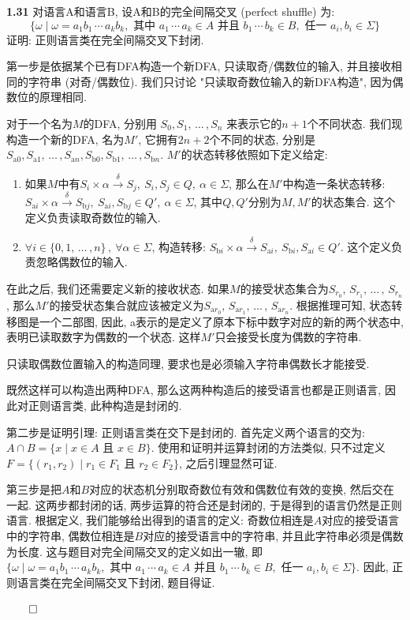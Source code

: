 \documentclass[UTF8]{report}
\newcommand{\problem}[1]{{\setlength{\parskip}{10pt}\noindent \bf{#1}}}
\renewenvironment{proof}{{\setlength{\parskip}{7pt}\noindent\hskip 2em \bf 证明 \quad}}{\hfill$\qed$\par}
\begin{document}
\problem{1.31} 对语言A和语言B, 设A和B的完全间隔交叉 (perfect shuffle) 为:
\[
    \{ \omega \mid \omega = a_1b_1 \,\cdots\, a_kb_k,\text{ 其中 } a_1\,\cdots\, a_k \in A \text{ 并且 } b_1\,\cdots\, b_k \in B, \text{ 任一 } a_i,b_i\in\Sigma \}
\]
证明: 正则语言类在完全间隔交叉下封闭.

\begin{proof}
    第一步是依据某个已有DFA构造一个新DFA, 只读取奇/偶数位的输入, 并且接收相同的字符串 (对奇/偶数位). 我们只讨论 "只读取奇数位输入的新DFA构造", 因为偶数位的原理相同.
    
    对于一个名为$M$的DFA, 分别用 $S_0, S_1,\,\dots\,,S_n$ 来表示它的$n+1$个不同状态. 我们现构造一个新的DFA, 名为$M'$, 它拥有$2n+2$个不同的状态, 分别是 $S_{\text{a}0}, S_{\text{a}1},\,\dots\,,S_{\text{a}n},S_{\text{b}0}, S_{\text{b}1},\,\dots\,,S_{\text{b}n}$. $M'$的状态转移依照如下定义给定:

    \begin{enumerate}
        \item 如果$M$中有$S_i\times \alpha \xrightarrow{\delta} S_j,\ S_i, S_j\in Q,\ \alpha\in\Sigma$, 那么在$M'$中构造一条状态转移: $S_{\text{a}i}\times \alpha \xrightarrow{\delta} S_{\text{b}j},\ S_{\text{a}i}, S_{\text{b}j}\in Q',\ \alpha\in\Sigma$, 其中$Q, Q'$分别为$M,M'$的状态集合. 这个定义负责读取奇数位的输入.
        \item $\forall i\in \{0,1,\,\dots\,,n\}\,,\ \forall \alpha\in\Sigma$, 构造转移: $S_{\text{b}i}\times \alpha \xrightarrow{\delta} S_{\text{a}i},\ S_{\text{b}i}, S_{\text{a}i}\in Q'$. 这个定义负责忽略偶数位的输入.
    \end{enumerate}

    在此之后, 我们还需要定义新的接收状态. 如果$M$的接受状态集合为$S_{r_0},\, S_{r_1},\,\dots\,,\,S_{r_n}$, 那么$M'$的接受状态集合就应该被定义为$S_{\text{a}r_0},\, S_{\text{a}r_1},\,\dots\,,\,S_{\text{a}r_n}$. 根据推理可知, 状态转移图是一个二部图, 因此, a表示的是定义了原本下标中数字对应的新的两个状态中, 表明已读取数字为偶数的一个状态. 这样$M'$只会接受长度为偶数的字符串.
    
    只读取偶数位置输入的构造同理, 要求也是必须输入字符串偶数长才能接受.

    既然这样可以构造出两种DFA, 那么这两种构造后的接受语言也都是正则语言, 因此对正则语言类, 此种构造是封闭的.
    
    第二步是证明引理: 正则语言类在交下是封闭的. 首先定义两个语言的交为: $A\cap B = \{ x\mid x\in A \text{ 且 } x\in B \}$. 使用和证明并运算封闭的方法类似, 只不过定义 $F = \{ (r_1,r_2)\mid r_1\in F_1 \text{ 且 } r_2\in F_2 \}$, 之后引理显然可证.
    
    第三步是把$A$和$B$对应的状态机分别取奇数位有效和偶数位有效的变换, 然后交在一起. 这两步都封闭的话, 两步运算的符合还是封闭的, 于是得到的语言仍然是正则语言. 根据定义, 我们能够给出得到的语言的定义: 奇数位相连是$A$对应的接受语言中的字符串, 偶数位相连是$B$对应的接受语言中的字符串, 并且此字符串必须是偶数为长度. 这与题目对完全间隔交叉的定义如出一辙, 即$\{\omega \mid \omega = a_1b_1 \,\cdots\, a_kb_k,\text{ 其中 } a_1\,\cdots\, a_k \in A \text{ 并且 } b_1\,\cdots\, b_k \in B, \text{ 任一 } a_i,b_i\in\Sigma\}$. 因此, 正则语言类在完全间隔交叉下封闭, 题目得证.
    
\end{proof}
\end{document}

